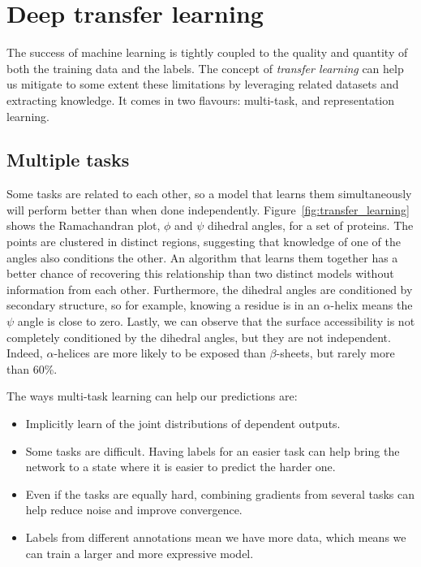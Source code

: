 \section{Deep transfer learning}\label{sec:transfer}
The success of machine learning is tightly coupled to the quality and quantity of both the training data and the labels.
The concept of \emph{transfer learning} can help us mitigate to some extent these limitations by leveraging related datasets and extracting knowledge.
It comes in two flavours: multi-task, and representation learning.

\subsection{Multiple tasks}
Some tasks are related to each other, so a model that learns them simultaneously will perform better than when done independently.
Figure~\ref{fig:transfer_learning} shows the Ramachandran plot,  $\phi$ and $\psi$ dihedral angles, for a set of proteins.
The points are clustered in distinct regions, suggesting that knowledge of one of the angles also conditions the other.
An algorithm that learns them together has a better chance of recovering this relationship than two distinct models without information from each other.
Furthermore, the dihedral angles are conditioned by secondary structure, so for example, knowing a residue is in an $\alpha$-helix means the $\psi$ angle is close to zero.
Lastly, we can observe that the surface accessibility is not completely conditioned by the dihedral angles, but they are not independent.
Indeed, $\alpha$-helices are more likely to be exposed than $\beta$-sheets, but rarely more than 60\%.

The ways multi-task learning  can help our predictions are:
\begin{itemize}
	\item Implicitly learn of the joint distributions of dependent outputs.
	\item Some tasks are difficult.
	Having labels for an easier task can help bring the network to a state where it is easier to predict the harder one.
	\item Even if the tasks are equally hard, combining gradients from several tasks can help reduce noise and improve convergence.
	\item Labels from different annotations mean we have more data, which means we can train a larger and more expressive model.
\end{itemize}

